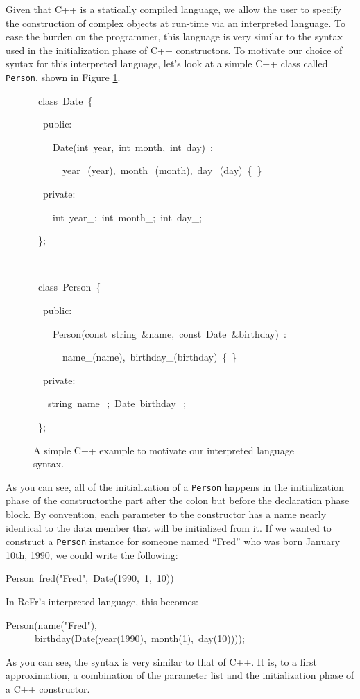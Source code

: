 \documentclass[a4paper]{article}
\let\textquotedbl="
\newenvironment{lyxcode}
{\par\begin{list}{}{
\scriptsize
\setlength{\leftmargin}{0.1in}
\setlength{\rightmargin}{\leftmargin}
\setlength{\listparindent}{0pt}%
\raggedright
\setlength{\itemsep}{0pt}
\setlength{\parsep}{0pt}
\normalfont\ttfamily}%
 \item[]}
{\end{list}}
\begin{document}
Given that C++ is a statically compiled language, we allow the user to specify
the construction of complex objects at run-time via an interpreted language. To
ease the burden on the programmer, this language is very similar to the syntax
used in the initialization phase of C++ constructors. To motivate our choice of
syntax for this interpreted language, let's look at a simple C++ class called
\texttt{Person}, shown in Figure \ref{fig:cpp-person-example}. 
\begin{figure}
\begin{lyxcode}

~class~Date~\{

~~public:

~~~~Date(int~year,~int~month,~int~day)~:

~~~~~~year\_(year),~month\_(month),~day\_(day)~\{~\}

~~private:

~~~~int~year\_;~int~month\_;~int~day\_;

~\};

\


~class~Person~\{

~~public:

~~~~Person(const~string~\&name,~const~Date~\&birthday)~:

~~~~~~name\_(name),~birthday\_(birthday)~\{~\}

~~private:

~~~string~name\_;~Date~birthday\_;

~\};
\end{lyxcode}
\vspace{-0.2in}
\caption{\label{fig:cpp-person-example}A simple C++ example to motivate our
interpreted language syntax.}
\end{figure}


As you can see, all of the initialization of a \texttt{Person} happens
in the initialization phase of the constructor\textemdash{}the part
after the colon but before the declaration phase block. By convention,
each parameter to the constructor has a name nearly identical to the
data member that will be initialized from it. If we wanted to construct
a \texttt{Person} instance for someone named \textquotedblleft{}Fred\textquotedblright{}
who was born January 10th, 1990, we could write
the following:
\begin{lyxcode}
Person~fred(\textquotedbl{}Fred\textquotedbl{},~Date(1990,~1,~10))
\end{lyxcode}
In ReFr's interpreted language, this becomes:
\begin{lyxcode}
Person(name(\textquotedbl{}Fred\textquotedbl{}),\\
~~~~~~birthday(Date(year(1990),~month(1),~day(10))));
\end{lyxcode}
As you can see, the syntax is very similar to that of C++. It is,
to a first approximation, a combination of the parameter list and
the initialization phase of a C++ constructor.
\end{document}
